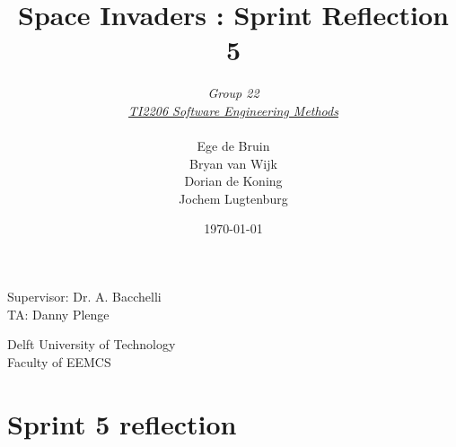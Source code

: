 \documentclass[10pt]{article}
\begin{document}
\title{Space Invaders : Sprint Reflection 5}
\date{\today}
\author{\textit{Group 22}\\ \textit{\underline{TI2206 Software Engineering Methods}} \\
 \\Ege de Bruin \\ Bryan van Wijk \\ Dorian de Koning \\ Jochem Lugtenburg }
 \maketitle  
 \begin{center}
Supervisor: Dr. A. Bacchelli\\
TA: Danny Plenge\\
 \end{center}     
 \begin{center}
 Delft University of Technology\\
 Faculty of EEMCS\\
 \end{center}
 \thispagestyle{empty}
 \pagebreak

\section*{Sprint 5 reflection}
\end{document}
